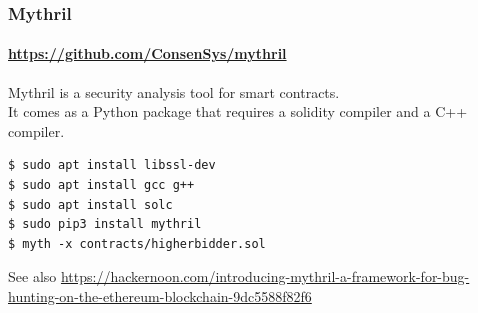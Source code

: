 \begin{frame}[fragile]
	\frametitle{Mythril}
	\framesubtitle{\url{https://github.com/ConsenSys/mythril}}
	Mythril is a security analysis tool for smart contracts.\\
	It comes as a Python package that requires a solidity compiler and a C++ compiler.
	\vspace{1em}
	\begin{Verbatim}[fontsize=\tiny]
$ sudo apt install libssl-dev
$ sudo apt install gcc g++
$ sudo apt install solc
$ sudo pip3 install mythril 
$ myth -x contracts/higherbidder.sol 
	\end{Verbatim}
	\vspace{3em}
	{\footnotesize See also \url{https://hackernoon.com/introducing-mythril-a-framework-for-bug-hunting-on-the-ethereum-blockchain-9dc5588f82f6}}
\end{frame}




